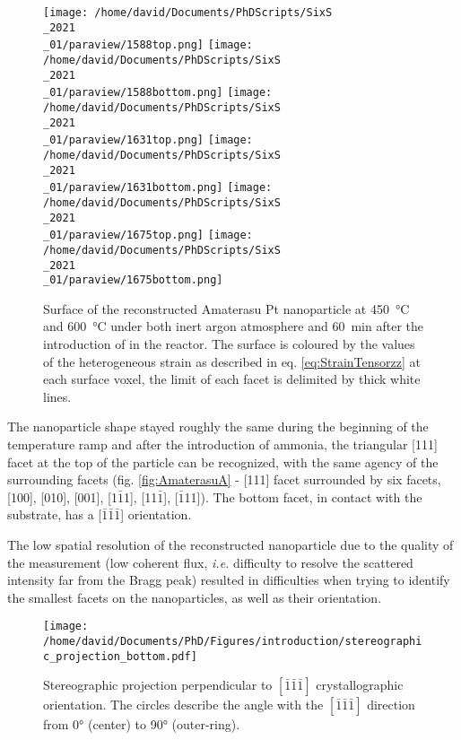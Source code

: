 \begin{figure}[!htb]
    \centering
    \texttt{[image: /home/david/Documents/PhDScripts/SixS\\\_2021\\\_01/paraview/1588top.png]}
    \texttt{[image: /home/david/Documents/PhDScripts/SixS\\\_2021\\\_01/paraview/1588bottom.png]}
    \texttt{[image: /home/david/Documents/PhDScripts/SixS\\\_2021\\\_01/paraview/1631top.png]}
    \texttt{[image: /home/david/Documents/PhDScripts/SixS\\\_2021\\\_01/paraview/1631bottom.png]}
    \texttt{[image: /home/david/Documents/PhDScripts/SixS\\\_2021\\\_01/paraview/1675top.png]}
    \texttt{[image: /home/david/Documents/PhDScripts/SixS\\\_2021\\\_01/paraview/1675bottom.png]}
    \caption{
        Surface of the reconstructed Amaterasu Pt nanoparticle at \qty{450}{\degreeCelsius} and \qty{600}{\degreeCelsius} under both inert argon atmosphere and \qty{60}{\minute} after the introduction of \ammonia in the reactor.
        The surface is coloured by the values of the heterogeneous strain as described in eq. \ref{eq:StrainTensorzz} at each surface voxel, the limit of each facet is delimited by thick white lines.
    }
    \label{fig:AmaterasuB}
\end{figure}

The nanoparticle shape stayed roughly the same during the beginning of the temperature ramp and after the introduction of ammonia, the triangular [111] facet at the top of the particle can be recognized, with the same agency of the surrounding facets (fig. \ref{fig:AmaterasuA} - [111] facet surrounded by six facets, [100], [010], [001], [1$\bar{1}$1], [11$\bar{1}$], [$\bar{1}$11]).
The bottom facet, in contact with the substrate, has a [$\bar{1}\bar{1}\bar{1}$] orientation.

The low spatial resolution of the reconstructed nanoparticle due to the quality of the measurement (low coherent flux, \textit{i.e.} difficulty to resolve the scattered intensity far from the Bragg peak) resulted in difficulties when trying to identify the smallest facets on the nanoparticles, as well as their orientation.

\begin{figure}[!htb]
    \centering
    \texttt{[image: /home/david/Documents/PhD/Figures/introduction/stereographic\_projection\_bottom.pdf]}
    \caption{
        Stereographic projection perpendicular to $[\bar{1}\bar{1}\bar{1}]$ crystallographic orientation.
        The circles describe the angle with the $[\bar{1}\bar{1}\bar{1}]$ direction from \ang{0} (center) to \ang{90} (outer-ring).
    }
    \label{fig:StereoBottom}
\end{figure}

